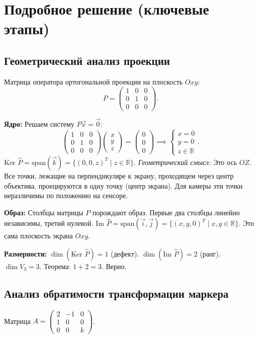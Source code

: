 \documentclass[a4paper,12pt]{article}
\begin{document}
\section{Подробное решение (ключевые этапы)}

\subsection{Геометрический анализ проекции}
Матрица оператора ортогональной проекции на плоскость $Oxy$:
\[
P = \begin{pmatrix} 
1 & 0 & 0 \\ 
0 & 1 & 0 \\ 
0 & 0 & 0 
\end{pmatrix}.
\]

\textbf{Ядро:} Решаем систему $P\vec{x} = \vec{0}$:
\[
\begin{pmatrix} 1 & 0 & 0 \\ 0 & 1 & 0 \\ 0 & 0 & 0 \end{pmatrix} \begin{pmatrix} x \\ y \\ z \end{pmatrix} = \begin{pmatrix} 0 \\ 0 \\ 0 \end{pmatrix} \implies \begin{cases} x=0 \\ y=0 \\ z \in \mathbb{R} \end{cases}.
\]
$\text{Ker }\hat{P} = \text{span}(\vec{k}) = \{(0,0,z)^T \mid z \in \mathbb{R}\}$. 
\textit{Геометрический смысл:} Это ось $OZ$. Все точки, лежащие на перпендикуляре к экрану, проходящем через центр объектива, проецируются в одну точку (центр экрана). Для камеры эти точки неразличимы по положению на сенсоре.

\textbf{Образ:} Столбцы матрицы $P$ порождают образ. Первые два столбцы линейно независимы, третий нулевой.
$\text{Im }\hat{P} = \text{span}(\vec{i}, \vec{j}) = \{(x,y,0)^T \mid x,y \in \mathbb{R}\}$.
Это сама плоскость экрана $Oxy$.

\textbf{Размерности:}
$\dim(\text{Ker }\hat{P}) = 1$ (дефект).
$\dim(\text{Im }\hat{P}) = 2$ (ранг).
$\dim V_3 = 3$.
Теорема: $1 + 2 = 3$. Верно.

\subsection{Анализ обратимости трансформации маркера}
Матрица $A = \begin{pmatrix} 2 & -1 & 0 \\ 1 & 0 & 0 \\ 0 & 0 & k \end{pmatrix}$.
\end{document}
